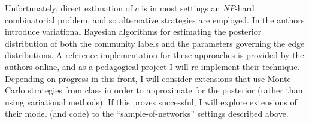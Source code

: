 \documentclass[12pt]{article}   %
\begin{document}
Unfortunately, direct estimation of $c$ is in most settings an $NP$-hard combinatorial problem, and so alternative strategies are employed.
In \cite{aicher_adapting_2013,aicher_learning_2015} the authors introduce variational Bayesian algorithms for estimating the posterior distribution of both the community labels and the parameters governing the edge distributions.
A reference implementation for these approaches is provided by the authors online, and as a pedagogical project I will re-implement their technique.
Depending on progress in this front, I will consider extensions that use Monte Carlo strategies from class in order to approximate for the posterior (rather than using variational methods).
If this proves successful, I will explore extensions of their model (and code) to the ``sample-of-networks'' settings described above.





\printbibliography
\end{document}
